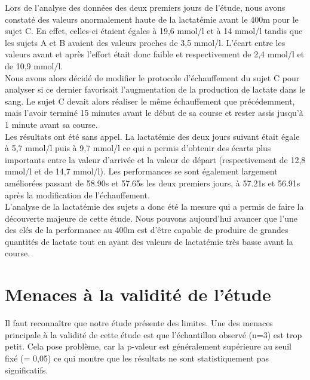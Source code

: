             Lors de l'analyse des données des deux premiers jours de l'étude, nous avons constaté des valeurs anormalement haute de la lactatémie avant le 400m pour le sujet C. En effet, celles-ci étaient égales à 19,6 mmol/l et à 14 mmol/l tandis que les sujets A et B avaient des valeurs proches de 3,5 mmol/l. L'écart entre les valeurs avant et après l'effort était donc faible et respectivement de 2,4 mmol/l et de 10,9 mmol/l.\\
            
            Nous avons alors décidé de modifier le protocole d'échauffement du sujet C pour analyser si ce dernier favorisait l'augmentation de la production de lactate dans le sang. Le sujet C devait alors réaliser le même échauffement que précédemment, mais l'avoir terminé 15 minutes avant le début de sa course et rester assis jusqu'à 1 minute avant sa course.\\
            
            Les résultats ont été sans appel. La lactatémie des deux jours suivant était égale à 5,7 mmol/l puis à 9,7 mmol/l ce qui a permis d'obtenir des écarts plus importants entre la valeur d'arrivée et la valeur de départ (respectivement de 12,8 mmol/l et de 14,7 mmol/l). Les performances se sont également largement améliorées passant de 58.90s et 57.65s les deux premiers jours, à 57.21s et 56.91s après la modification de l'échauffement.\\
            
            L'analyse de la lactatémie des sujets a donc été la mesure qui a permis de faire la découverte majeure de cette étude. Nous pouvons aujourd'hui avancer que l'une des clés de la performance au 400m est d'être capable de produire de grandes quantités de lactate tout en ayant des valeurs de lactatémie très basse avant la course. 

        
    \section{Menaces à la validité de l'étude}
        
        Il faut reconnaître que notre étude présente des limites. Une des menaces principale à la validité de cette étude est que l'échantillon observé (n=3) est trop petit. Cela pose problème, car la p-valeur est généralement supérieure au seuil fixé (\si{\alpha}= 0,05) ce qui montre que les résultats ne sont statistiquement pas significatifs. \\
        
